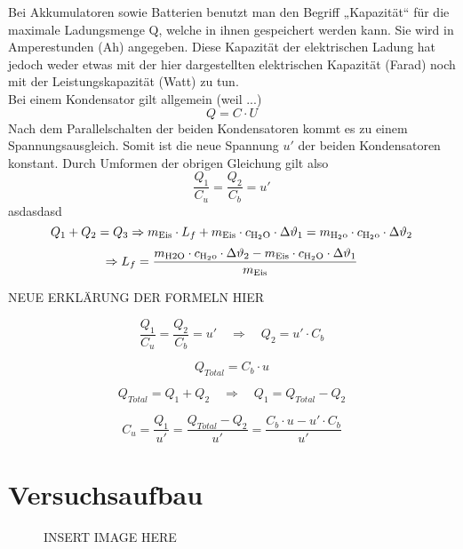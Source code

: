 \documentclass[a4paper,12pt]{article}
\begin{document}
Bei Akkumulatoren sowie Batterien benutzt man den Begriff „Kapazität“ für die maximale Ladungsmenge Q, welche in ihnen gespeichert werden kann. Sie wird in Amperestunden (Ah) angegeben. Diese Kapazität der elektrischen Ladung hat jedoch weder etwas mit der hier dargestellten elektrischen Kapazität (Farad) noch mit der Leistungskapazität (Watt) zu tun.\\

Bei einem Kondensator gilt allgemein (weil ...)
$$Q=C\cdot U$$
Nach dem Parallelschalten der beiden Kondensatoren kommt es zu einem Spannungsausgleich. Somit ist die neue Spannung $u'$ der beiden Kondensatoren konstant. Durch Umformen der obrigen Gleichung gilt also
$$\frac{Q_1}{C_u} = \frac{Q_2}{C_b} = u'$$
asdasdasd
$$ Q_{1} + Q_{2} = Q_{3} \Rightarrow m_{\rm{Eis}} \cdot L_f + m_{\rm{Eis}} \cdot c_{\rm{H_2O}} \cdot \Delta\vartheta_1 = m_{\rm{H_2o}} \cdot c_{\rm{H_2o}} \cdot \Delta\vartheta_2$$ $$ \Rightarrow L_f = \frac{m_{\rm{H2O}} \cdot c_{\rm{H_2o}} \cdot \Delta\vartheta_2 - m_{\rm{Eis}} \cdot c_{\rm{H_2O}} \cdot \Delta\vartheta_1}{m_{\rm{Eis}}}$$

NEUE ERKLÄRUNG DER FORMELN HIER

$$\frac{Q_1}{C_u} = \frac{Q_2}{C_b} = u'\quad \Rightarrow \quad Q_2 = u' \cdot C_b$$

$$Q_{Total} = C_b \cdot u$$

$$Q_{Total} = Q_1+Q_2 \quad \Rightarrow \quad Q_1=Q_{Total}-Q_2$$

$$C_u = \frac{Q_1}{u'} = \frac{Q_{Total}-Q_2}{u'} = \frac{C_b \cdot u - u' \cdot C_b}{u'}$$

\section{Versuchsaufbau}
\begin{figure}[H]

INSERT IMAGE HERE

\end{figure}
\end{document}
